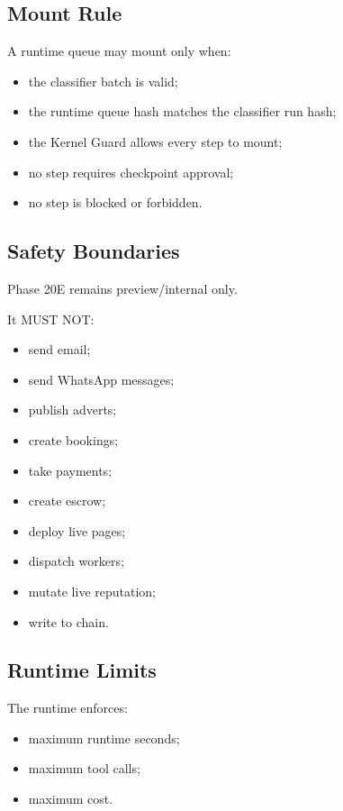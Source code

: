\subsection{Mount Rule}

A runtime queue may mount only when:

\begin{itemize}
  \item the classifier batch is valid;
  \item the runtime queue hash matches the classifier run hash;
  \item the Kernel Guard allows every step to mount;
  \item no step requires checkpoint approval;
  \item no step is blocked or forbidden.
\end{itemize}

\subsection{Safety Boundaries}

Phase 20E remains preview/internal only.

It MUST NOT:

\begin{itemize}
  \item send email;
  \item send WhatsApp messages;
  \item publish adverts;
  \item create bookings;
  \item take payments;
  \item create escrow;
  \item deploy live pages;
  \item dispatch workers;
  \item mutate live reputation;
  \item write to chain.
\end{itemize}

\subsection{Runtime Limits}

The runtime enforces:

\begin{itemize}
  \item maximum runtime seconds;
  \item maximum tool calls;
  \item maximum cost.
\end{itemize}

